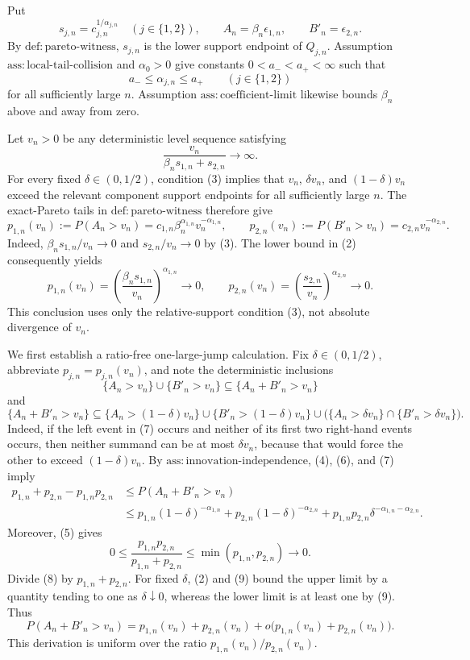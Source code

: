 Put
\[
s_{j,n}=c_{j,n}^{1/\alpha_{j,n}}\quad(j\in\{1,2\}),
\qquad A_n=\beta_n\epsilon_{1,n},
\qquad B'_n=\epsilon_{2,n}.
\tag{1}
\]
By \(\mathrm{def{:}pareto\text{-}witness}\), \(s_{j,n}\) is the lower support endpoint of \(Q_{j,n}\). Assumption \(\mathrm{ass{:}local\text{-}tail\text{-}collision}\) and \(\alpha_0>0\) give constants \(0<a_-<a_+<\infty\) such that
\[
a_-\leq\alpha_{j,n}\leq a_+
\qquad(j\in\{1,2\})
\tag{2}
\]
for all sufficiently large \(n\). Assumption \(\mathrm{ass{:}coefficient\text{-}limit}\) likewise bounds \(\beta_n\) above and away from zero.

Let \(v_n>0\) be any deterministic level sequence satisfying
\[
\frac{v_n}{\beta_ns_{1,n}+s_{2,n}}\to\infty.
\tag{3}
\]
For every fixed \(\delta\in(0,1/2)\), condition (3) implies that \(v_n\), \(\delta v_n\), and \((1-\delta)v_n\) exceed the relevant component support endpoints for all sufficiently large \(n\). The exact-Pareto tails in \(\mathrm{def{:}pareto\text{-}witness}\) therefore give
\[
p_{1,n}(v_n):=P(A_n>v_n)
=c_{1,n}\beta_n^{\alpha_{1,n}}v_n^{-\alpha_{1,n}},
\qquad
p_{2,n}(v_n):=P(B'_n>v_n)
=c_{2,n}v_n^{-\alpha_{2,n}}.
\tag{4}
\]
Indeed, \(\beta_ns_{1,n}/v_n\to0\) and \(s_{2,n}/v_n\to0\) by (3). The lower bound in (2) consequently yields
\[
p_{1,n}(v_n)=\left(\frac{\beta_ns_{1,n}}{v_n}\right)^{\alpha_{1,n}}\to0,
\qquad
p_{2,n}(v_n)=\left(\frac{s_{2,n}}{v_n}\right)^{\alpha_{2,n}}\to0.
\tag{5}
\]
This conclusion uses only the relative-support condition (3), not absolute divergence of \(v_n\).

We first establish a ratio-free one-large-jump calculation. Fix \(\delta\in(0,1/2)\), abbreviate \(p_{j,n}=p_{j,n}(v_n)\), and note the deterministic inclusions
\[
\{A_n>v_n\}\cup\{B'_n>v_n\}
\subseteq\{A_n+B'_n>v_n\}
\tag{6}
\]
and
\[
\{A_n+B'_n>v_n\}
\subseteq
\{A_n>(1-\delta)v_n\}\cup\{B'_n>(1-\delta)v_n\}
\cup\bigl(\{A_n>\delta v_n\}\cap\{B'_n>\delta v_n\}\bigr).
\tag{7}
\]
Indeed, if the left event in (7) occurs and neither of its first two right-hand events occurs, then neither summand can be at most \(\delta v_n\), because that would force the other to exceed \((1-\delta)v_n\). By \(\mathrm{ass{:}innovation\text{-}independence}\), (4), (6), and (7) imply
\[
\begin{split}
p_{1,n}+p_{2,n}-p_{1,n}p_{2,n}
&\leq P(A_n+B'_n>v_n)\\
&\leq p_{1,n}(1-\delta)^{-\alpha_{1,n}}
+p_{2,n}(1-\delta)^{-\alpha_{2,n}}
+p_{1,n}p_{2,n}\delta^{-\alpha_{1,n}-\alpha_{2,n}}.
\end{split}
\tag{8}
\]
Moreover, (5) gives
\[
0\leq\frac{p_{1,n}p_{2,n}}{p_{1,n}+p_{2,n}}
\leq\min(p_{1,n},p_{2,n})\to0.
\tag{9}
\]
Divide (8) by \(p_{1,n}+p_{2,n}\). For fixed \(\delta\), (2) and (9) bound the upper limit by a quantity tending to one as \(\delta\downarrow0\), whereas the lower limit is at least one by (9). Thus
\[
P(A_n+B'_n>v_n)
=p_{1,n}(v_n)+p_{2,n}(v_n)
+o\bigl(p_{1,n}(v_n)+p_{2,n}(v_n)\bigr).
\tag{10}
\]
This derivation is uniform over the ratio \(p_{1,n}(v_n)/p_{2,n}(v_n)\).

